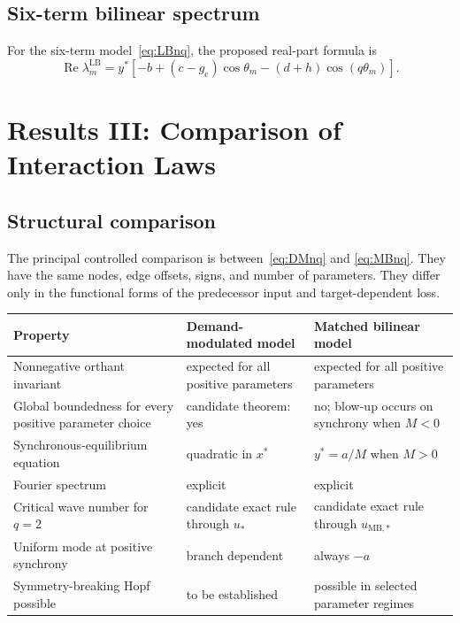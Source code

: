 \documentclass[11pt, reqno]{amsart}
\theoremstyle{definition}
\theoremstyle{remark}
\newcommand{\MB}{\mathrm{MB}}
\newcommand{\LB}{\mathrm{LB}}
\newcommand{\Ree}{\operatorname{Re}}
\begin{document}
	\subsection{Six-term bilinear spectrum}
	
	For the six-term model~\eqref{eq:LBnq}, the proposed real-part formula is
	\begin{equation}
		\label{eq:six-term-real}
		\Ree\lambda_m^{\LB}
		=
		y^*
		\left[
		-b+(c-g_{\mathrm c})\cos\theta_m-(d+h)\cos(q\theta_m)
		\right].
	\end{equation}
	
	
	\section{Results III: Comparison of Interaction Laws}
	\label{sec:comparison}
	
	\subsection{Structural comparison}
	
	The principal controlled comparison is between~\eqref{eq:DMnq} and
	\eqref{eq:MBnq}.  They have the same nodes, edge offsets, signs, and number of
	parameters.  They differ only in the functional forms of the predecessor input
	and target-dependent loss.
	
	\begin{center}
		\begin{tabular}{p{4.5cm}p{4.5cm}p{4.5cm}}
			\toprule
			Property & Demand-modulated model & Matched bilinear model \\
			\midrule
			Nonnegative orthant invariant & expected for all positive parameters & expected for all positive parameters \\
			Global boundedness for every positive parameter choice & candidate theorem: yes & no; blow-up occurs on synchrony when $M<0$ \\
			Synchronous-equilibrium equation & quadratic in $x^*$ & $y^*=a/M$ when $M>0$ \\
			Fourier spectrum & explicit & explicit \\
			Critical wave number for $q=2$ & candidate exact rule through $u_*$ & candidate exact rule through $u_{\MB,*}$ \\
			Uniform mode at positive synchrony & branch dependent & always $-a$ \\
			Symmetry-breaking Hopf possible & to be established & possible in selected parameter regimes \\
			\bottomrule
		\end{tabular}
	\end{center}
	
\end{document}
